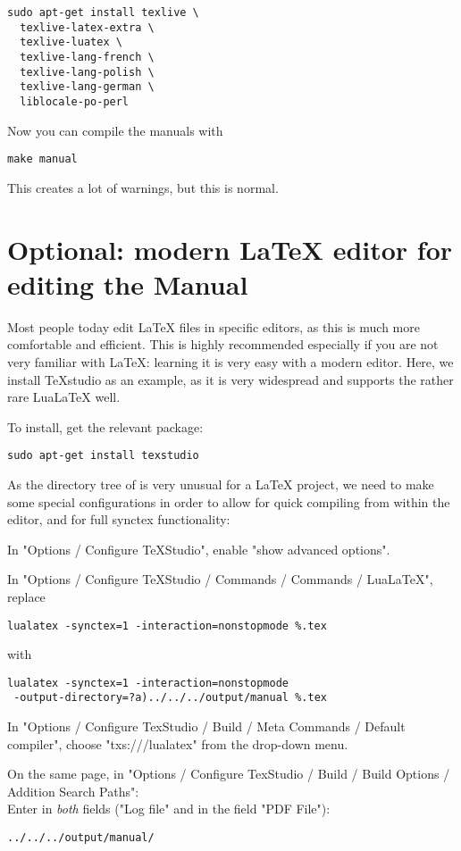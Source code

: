 \begin{verbatim}
sudo apt-get install texlive \
  texlive-latex-extra \
  texlive-luatex \
  texlive-lang-french \
  texlive-lang-polish \
  texlive-lang-german \
  liblocale-po-perl
\end{verbatim}

Now you can compile the manuals with 

\begin{verbatim}
make manual
\end{verbatim}

This creates a lot of warnings, but this is normal.

\section{Optional: modern LaTeX editor for editing the Manual}
Most people today edit LaTeX files in specific editors, as this is much more comfortable and efficient. This is highly recommended especially if you are not very familiar with LaTeX: learning it is very easy with a modern editor. Here, we install TeXstudio as an example, as it is very widespread and supports the rather rare LuaLaTeX well.

To install, get the relevant package:

\begin{verbatim}
sudo apt-get install texstudio
\end{verbatim}

As the directory tree of \xc is very unusual for a LaTeX project, we need to make some special configurations in order to allow for quick compiling from within the editor, and for full synctex functionality:

In "Options / Configure TeXStudio", enable "show advanced options".

In "Options / Configure TeXStudio / Commands / Commands / LuaLaTeX", replace
\begin{verbatim}
lualatex -synctex=1 -interaction=nonstopmode %.tex
\end{verbatim}
with
\begin{verbatim}
lualatex -synctex=1 -interaction=nonstopmode
 -output-directory=?a)../../../output/manual %.tex
\end{verbatim}

In "Options / Configure TexStudio / Build / Meta Commands / Default compiler", choose
"txs:///lualatex" from the drop-down menu.

On the same page, in "Options / Configure TexStudio / Build / Build Options / Addition Search Paths":\\
Enter in \emph{both} fields ("Log file" and in the field "PDF File"):
\begin{verbatim}
../../../output/manual/
\end{verbatim}



